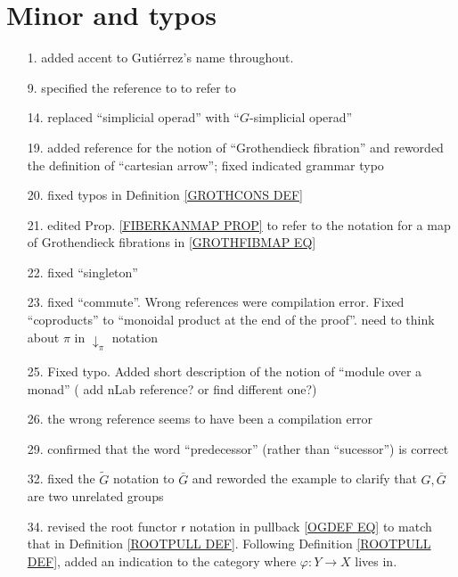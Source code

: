\documentclass{article}
\begin{document}
\section{Minor and typos} 


\begin{itemize}
\item[1.] added accent to Guti\'{e}rrez's name throughout.

\item[9.] specified the reference to 
\cite{Elm83}
to refer to
\cite[\S 3]{Elm83}

\item[14.] replaced ``simplicial operad'' with  ``$G$-simplicial operad''

\item[19.] added reference for the notion of ``Grothendieck fibration'' and reworded the definition of ``cartesian arrow''; fixed indicated grammar typo

\item[20.] fixed typos in Definition \ref{GROTHCONS DEF}

\item[21.] edited Prop. \ref{FIBERKANMAP PROP} to refer to the notation for a map of Grothendieck fibrations in \eqref{GROTHFIBMAP EQ}

\item[22.] fixed ``singleton''

\item[23.] fixed ``commute''. Wrong references were compilation error.
Fixed ``coproducts'' to ``monoidal product at the end of the proof''. {\color{red} need to think about $\pi$ in $\downarrow_{\pi}$ notation}

\item[25.] Fixed typo. Added short description of the notion of ``module over a monad'' ({\color{red} add nLab reference? or find different one?})

\item[26.] the wrong reference seems to have been a compilation error

\item[29.] confirmed that the word ``predecessor'' (rather than ``sucessor'') is correct

\item[32.] fixed the $\tilde{G}$ notation to $\bar{G}$ and reworded the example to clarify that $G,\bar{G}$ are two unrelated groups

\item[34.] revised the root functor $\mathsf{r}$ notation in pullback \eqref{OGDEF EQ} 
to match that in Definition \ref{ROOTPULL DEF}.
Following Definition \ref{ROOTPULL DEF},
added an indication to the category where 
$\varphi \colon Y \to X$ lives in.


\end{itemize}
\end{document}
